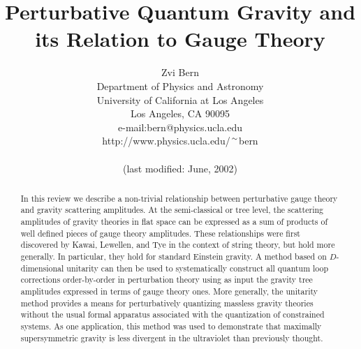 \documentclass[12pt]{livrev}
\begin{document}
\title{Perturbative Quantum Gravity and its Relation to
Gauge Theory}

\author{Zvi Bern \\
        Department of Physics and Astronomy\\
        University of California at Los Angeles \\
        Los Angeles, CA 90095 \\
        e-mail:bern@physics.ucla.edu \\
        http://www.physics.ucla.edu/${\sim \atop \null}\hskip -.03 cm$bern\\
\\
\small{(last modified: June, 2002)}
}

\date{}
\maketitle

\begin{abstract}

In this review we describe a non-trivial relationship between
perturbative gauge theory and gravity scattering amplitudes.
At the semi-classical or tree level, the scattering amplitudes of
gravity theories in flat space can be expressed as a sum of products
of well defined pieces of gauge theory amplitudes. These relationships
were first discovered by Kawai, Lewellen, and Tye in the context of
string theory, but hold more generally.  In particular, they hold for
standard Einstein gravity. A method based on $D$-dimensional unitarity
can then be used to systematically construct all quantum loop
corrections order-by-order in perturbation theory using as input the
gravity tree amplitudes expressed in terms of gauge theory ones.  More
generally, the unitarity method provides a means for perturbatively
quantizing massless gravity theories without the usual formal
apparatus associated with the quantization of constrained systems.  As
one application, this method was used to demonstrate that maximally
supersymmetric gravity is less divergent in the ultraviolet than
previously thought.

\end{abstract}


\newpage



\end{document}
